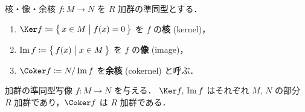 \documentclass[geometry_main]{subfiles}
\begin{document}
\begin{mydef}[label=def:ker-module]{核・像・余核}
	$f \colon M \to N$ を $R$ 加群の準同型とする．
	\begin{enumerate}
		\item $\Ker f \coloneqq \bigl\{\, x \in M \bigm| f(x) = 0 \,\bigr\} $ を $f$ の\textbf{核} (kernel)，
		\item $\Im f \coloneqq \bigl\{\, f(x) \bigm| x \in M \,\bigr\} $ を $f$ の\textbf{像} (image)，
		\item $\Coker f \coloneqq N/\Im f$ を\textbf{余核} (cokernel) と呼ぶ．
	\end{enumerate}
\end{mydef}

\begin{myprop}[label=prop:ker-module]{}
	加群の準同型写像 $f \colon M \to N$ を与える．
	$\Ker f,\, \Im f$ はそれぞれ $M,\, N$ の部分 $R$ 加群であり，$\Coker f$ は $R$ 加群である．
\end{myprop}
\end{document}
